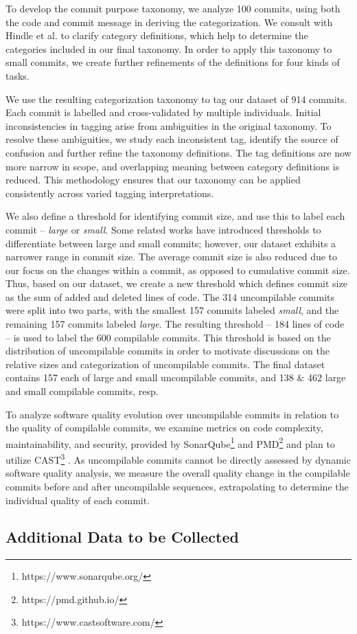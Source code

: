 To develop the commit purpose taxonomy, we analyze 100 commits, using both the code and commit message in deriving the categorization. We consult with Hindle et al. to clarify category definitions, which help to determine the categories included in our final taxonomy. 
In order to apply this taxonomy to small commits, we create further refinements of the definitions for four kinds of tasks. 

We use the resulting categorization taxonomy to tag our dataset of 914 commits. Each commit is labelled and cross-validated by multiple individuals. 
Initial inconsistencies in tagging arise from ambiguities in the original taxonomy. 
To resolve these ambiguities, we study each inconsistent tag, identify the source of confusion and further refine the taxonomy definitions. 
The tag definitions are now more narrow in scope, and overlapping meaning between category definitions is reduced. 
This methodology ensures that our taxonomy can be applied consistently across varied tagging interpretations. 

We also define a threshold for identifying commit size, and use this to label each commit -- \textit{large} or \textit{small}. 
Some related works have introduced thresholds to differentiate between large and small commits; however, our dataset exhibits a narrower range in commit size. 
The average commit size is also reduced due to our focus on the changes within a commit, as opposed to cumulative commit size. 
Thus, based on our dataset, we create a new threshold which defines commit size as the sum of added and deleted lines of code. The 314 uncompilable commits were split into two parts, with the smallest 157 commits labeled \textit{small}, and the remaining 157 commits labeled \textit{large}. 
The resulting threshold -- 184 lines of code -- is used to label the 600 compilable commits.
This threshold is based on the distribution of uncompilable commits in order to motivate discussions on the relative sizes and categorization of uncompilable commits. The final dataset contains 157 each of large and small uncompilable commits, and 138 \& 462 large and small compilable commits, resp.

To analyze software quality evolution over uncompilable commits in relation to the quality of compilable commits, we examine metrics on code complexity, maintainability, and security, provided by SonarQube\footnote{https://www.sonarqube.org/} and PMD\footnote{https://pmd.github.io/} and plan to utilize CAST\footnote{https://www.castsoftware.com/} . As uncompilable commits cannot be directly assessed by dynamic software quality analysis, we measure the overall quality change in the compilable commits before and after uncompilable sequences, extrapolating to determine the individual quality of each commit. 


\subsection{Additional Data to be Collected}
